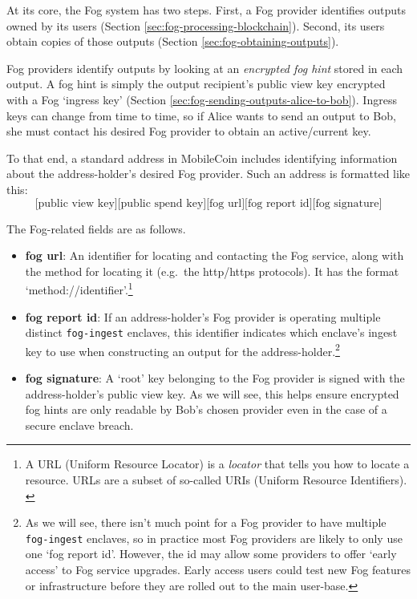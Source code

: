 At its core, the Fog system has two steps. First, a Fog provider identifies outputs owned by its users (Section \ref{sec:fog-processing-blockchain}). Second, its users obtain copies of those outputs (Section \ref{sec:fog-obtaining-outputs}).

Fog providers identify outputs by looking at an {\em encrypted fog hint} stored in each output. A fog hint is simply the output recipient's public view key encrypted with a Fog `ingress key' (Section \ref{sec:fog-sending-outputs-alice-to-bob}). Ingress keys can change from time to time, so if Alice wants to send an output to Bob, she must contact his desired Fog provider to obtain an active/current key.

To that end, a standard address in MobileCoin includes identifying information about the address-holder's desired Fog provider. Such an address is formatted like this:\vspace{.155cm}%
\[\textrm{[public view key][public spend key][fog url][fog report id][fog signature]}\]

The Fog-related fields are as follows.
\begin{itemize}
    \item \textbf{fog url}: An identifier for locating and contacting the Fog service, along with the method for locating it (e.g.\ the http/https protocols). It has the format `method://identifier'.\footnote{A URL (Uniform Resource Locator) is a {\em locator} that tells you how to locate a resource. URLs are a subset of so-called URIs (Uniform Resource Identifiers). \cite{uri-vs-url-semantics}}

    \item \textbf{fog report id}: If an address-holder's Fog provider is operating multiple distinct {\tt fog-ingest} enclaves, this identifier indicates which enclave's ingest key to use when constructing an output for the address-holder.\footnote{As we will see, there isn't much point for a Fog provider to have multiple {\tt fog-ingest} enclaves, so in practice most Fog providers are likely to only use one `fog report id'. However, the id may allow some providers to offer `early access' to Fog service upgrades. Early access users could test new Fog features or infrastructure before they are rolled out to the main user-base.}

    \item \textbf{fog signature}: A `root' key belonging to the Fog provider is signed with the address-holder's public view key. As we will see, this helps ensure encrypted fog hints are only readable by Bob's chosen provider even in the case of a secure enclave breach.
\end{itemize}


